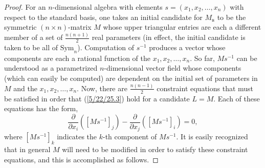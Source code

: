 \documentclass{amsart}
\theoremstyle{definition}
\numberwithin{theorem}{section}
\numberwithin{equation}{section}
\begin{document}
\begin{proof} For an $n$-dimensional algebra with elements $s = (x_1,x_2,\dots,x_n)$ with respect to the standard basis, one takes an initial candidate for $M_\mathfrak{u}$ to be the symmetric $(n\times n)$-matrix $M$ whose upper triangular entries are each a different member of a set of $\frac{n(n+1)}{2}$ real parameters (in effect, the initial candidate is taken to be all of $\text{Sym}_n$).  Computation of $s^{-1}$ produces a vector whose components are each a rational function of the $x_1,x_2,\dots,x_n$.  So far, $Ms^{-1}$ can be understood as a parametrized \mbox{$n$-dimensional} vector field whose components (which can easily be computed) are dependent on the initial set of parameters in $M$ and the $x_1,x_2,\dots,x_n$.  Now, there are $\frac{n(n-1)}{2}$ constraint equations that must be satisfied in order that (\ref{5/22/25.3}) hold for a candidate $L=M$.  Each of these equations has the form, \begin{equation}\label{9/2/24.2} \frac{\partial}{\partial x_i}([Ms^{-1}]_j) - \frac{\partial}{\partial x_j}([Ms^{-1}]_i) = 0,\end{equation} where $[Ms^{-1}]_k$ indicates the $k$-th component of $Ms^{-1}$.  It is easily recognized that in general $M$ will need to be modified in order to satisfy these constraint equations, and this is accomplished as follows.  


\end{proof}
\end{document}
